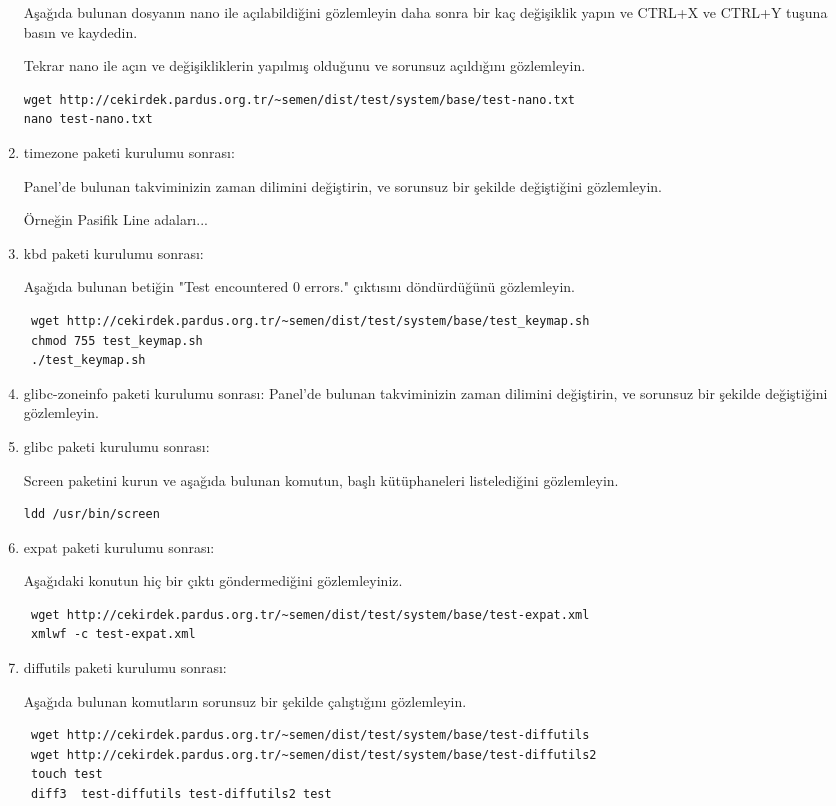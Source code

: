 \documentclass[a4paper,10pt]{article}
\begin{document}
\begin{enumerate}
Aşağıda bulunan dosyanın nano ile açılabildiğini gözlemleyin daha sonra bir kaç değişiklik yapın ve CTRL+X ve CTRL+Y tuşuna basın ve kaydedin. 

Tekrar nano ile açın ve değişikliklerin yapılmış olduğunu ve sorunsuz açıldığını gözlemleyin.
\begin{verbatim}
wget http://cekirdek.pardus.org.tr/~semen/dist/test/system/base/test-nano.txt 
nano test-nano.txt
\end{verbatim}


\item timezone paketi kurulumu sonrası:

Panel'de bulunan takviminizin zaman dilimini değiştirin, ve sorunsuz bir şekilde değiştiğini gözlemleyin.

Örneğin Pasifik Line adaları...

\item kbd paketi kurulumu sonrası:

Aşağıda bulunan betiğin "Test encountered 0 errors." çıktısını döndürdüğünü gözlemleyin.
\begin{verbatim}
 wget http://cekirdek.pardus.org.tr/~semen/dist/test/system/base/test_keymap.sh
 chmod 755 test_keymap.sh
 ./test_keymap.sh
\end{verbatim}



\item glibc-zoneinfo paketi kurulumu sonrası:
Panel'de bulunan takviminizin zaman dilimini değiştirin, ve sorunsuz bir şekilde değiştiğini gözlemleyin.

\item glibc paketi kurulumu sonrası:

Screen paketini kurun ve aşağıda bulunan komutun, başlı kütüphaneleri listelediğini gözlemleyin.
\begin{verbatim}
ldd /usr/bin/screen 
\end{verbatim}

\item expat paketi kurulumu sonrası:

Aşağıdaki konutun hiç bir çıktı göndermediğini gözlemleyiniz.
\begin{verbatim}
 wget http://cekirdek.pardus.org.tr/~semen/dist/test/system/base/test-expat.xml
 xmlwf -c test-expat.xml
\end{verbatim}

\item diffutils paketi kurulumu sonrası:

Aşağıda bulunan komutların sorunsuz bir şekilde çalıştığını gözlemleyin.
\begin{verbatim}
 wget http://cekirdek.pardus.org.tr/~semen/dist/test/system/base/test-diffutils
 wget http://cekirdek.pardus.org.tr/~semen/dist/test/system/base/test-diffutils2
 touch test
 diff3  test-diffutils test-diffutils2 test 
\end{verbatim}


\end{enumerate}
\end{document}
